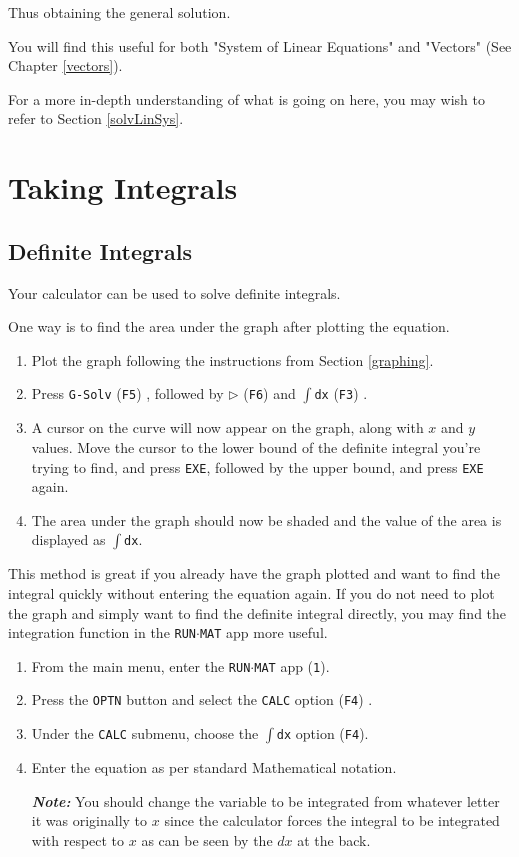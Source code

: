 \documentclass[a5paper,draft]{memoir}
\def\code#1{\texttt{#1}}
\def\note#1{\textbf{\textit{Note:}} #1}
\def\runmat{\code{RUN$\cdot$MAT} }
\def\Fthree{(\code{F3}) }
\def\Ffour{(\code{F4}) }
\def\Ffive{(\code{F5}) }
\def\Fsix{(\code{F6}) }
\begin{document}
\begin{itemize}
	Thus obtaining the general solution. 
\end{itemize}

You will find this useful for both "System of Linear Equations" and "Vectors" (See Chapter \ref{vectors}). 

For a more in-depth understanding of what is going on here, you may wish to refer to Section \ref{solvLinSys}.

\section{Taking Integrals}
\subsection{Definite Integrals}
Your calculator can be used to solve definite integrals.

One way is to find the area under the graph after plotting the equation.

\begin{enumerate}
	\item Plot the graph following the instructions from Section \ref{graphing}.
	\item Press \code{G-Solv} \Ffive, followed by $\triangleright$ \Fsix and \code{$\int$dx} \Fthree.
	\item A cursor on the curve will now appear on the graph, along with $x$ and $y$ values. Move the cursor to the lower bound of the definite integral you're trying to find, and press \code{EXE}, followed by the upper bound, and press \code{EXE} again.
	\item The area under the graph should now be shaded and the value of the area is displayed as \code{$\int$dx}.
\end{enumerate}

This method is great if you already have the graph plotted and want to find the integral quickly without entering the equation again. If you do not need to plot the graph and simply want to find the definite integral directly, you may find the integration function in the \runmat app more useful.

\begin{enumerate}
	\item From the main menu, enter the \runmat app (\code{1}).
	\item Press the \code{OPTN} button and select the \code{CALC} option \Ffour.
	\item Under the \code{CALC} submenu, choose the \code{$\int$dx} option (\code{F4}).
	\item Enter the equation as per standard Mathematical notation. 
	
	\note{You should change the variable to be integrated from whatever letter it was originally to $x$ since the calculator forces the integral to be integrated with respect to $x$ as can be seen by the $dx$ at the back.}
\end{enumerate}
\end{document}
